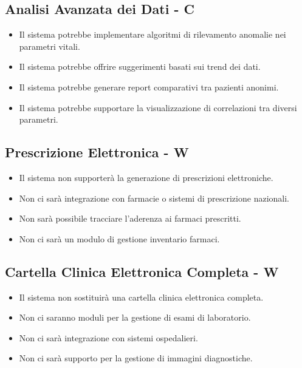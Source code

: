 \documentclass[12pt,a4paper,oneside]{report}
\begin{document}
\subsection{Analisi Avanzata dei Dati  - C}

\begin{itemize}
    \item Il sistema potrebbe implementare algoritmi di rilevamento anomalie nei parametri vitali.
    \item Il sistema potrebbe offrire suggerimenti basati sui trend dei dati.
    \item Il sistema potrebbe generare report comparativi tra pazienti anonimi.
    \item Il sistema potrebbe supportare la visualizzazione di correlazioni tra diversi parametri.
\end{itemize}

\subsection{Prescrizione Elettronica - W}

\begin{itemize}
    \item Il sistema non supporterà la generazione di prescrizioni elettroniche.
    \item Non ci sarà integrazione con farmacie o sistemi di prescrizione nazionali.
    \item Non sarà possibile tracciare l'aderenza ai farmaci prescritti.
    \item Non ci sarà un modulo di gestione inventario farmaci.
\end{itemize}

\subsection{Cartella Clinica Elettronica Completa  - W}

\begin{itemize}
    \item Il sistema non sostituirà una cartella clinica elettronica completa.
    \item Non ci saranno moduli per la gestione di esami di laboratorio.
    \item Non ci sarà integrazione con sistemi ospedalieri.
    \item Non ci sarà supporto per la gestione di immagini diagnostiche.
\end{itemize}
\end{document}
